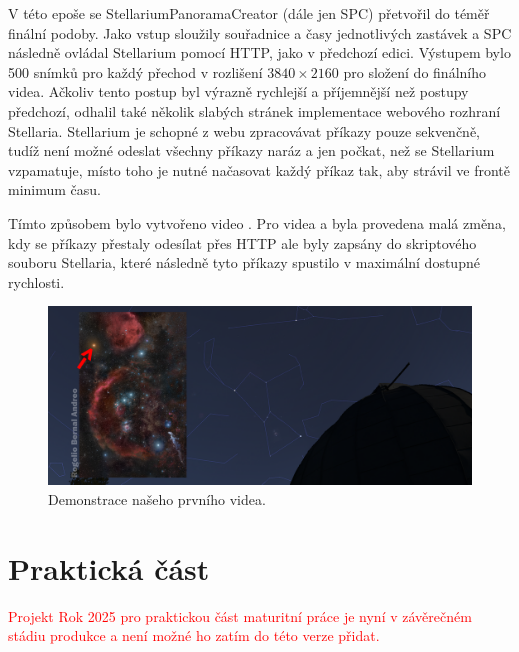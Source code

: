 \documentclass[12pt,a4paper,titlepage]{article}
\begin{document}
V této epoše se StellariumPanoramaCreator (dále jen SPC) přetvořil do téměř finální podoby. Jako vstup sloužily souřadnice a časy jednotlivých zastávek a SPC následně ovládal Stellarium pomocí HTTP, jako v předchozí edici. Výstupem bylo 500 snímků pro každý přechod v rozlišení \(3840\times2160\) pro složení do finálního videa. Ačkoliv tento postup byl výrazně rychlejší a příjemnější než postupy předchozí, odhalil také několik slabých stránek implementace webového rozhraní Stellaria. Stellarium je schopné z webu zpracovávat příkazy pouze sekvenčně, tudíž není možné odeslat všechny příkazy naráz a jen počkat, než se Stellarium vzpamatuje, místo toho je nutné načasovat každý příkaz tak, aby strávil ve frontě minimum času.

Tímto způsobem bylo vytvořeno video . Pro videa  a  byla provedena malá změna, kdy se příkazy přestaly odesílat přes HTTP ale byly zapsány do skriptového souboru Stellaria, které následně tyto příkazy spustilo v maximální dostupné rychlosti.
\begin{figure}[ht]
	\centering
	\includegraphics[width=.85\textwidth]{unor.png}
	\caption{Demonstrace našeho prvního videa.}\label{img:unor}
\end{figure}
\newpage
\part{Praktická část}
\textcolor{red}{Projekt Rok 2025 pro praktickou část maturitní práce je nyní v závěrečném stádiu produkce a není možné ho zatím do této verze přidat.}
\end{document}
